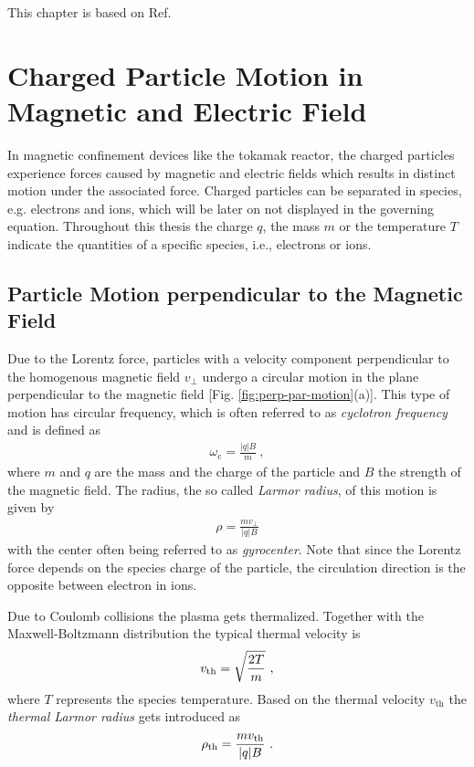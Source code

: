 
This chapter is based on Ref.  

\section{Charged Particle Motion in Magnetic and Electric Field}
\label{sec:motion}

In magnetic confinement devices like the tokamak reactor, the charged particles experience forces caused by magnetic and electric fields which results in distinct motion under the associated force. Charged particles can be separated in species, e.g. electrons and ions, which will be later on not displayed in the governing equation. Throughout this thesis the charge $q$, the mass $m$ or the temperature $T$ indicate the quantities of a specific species, i.e., electrons or ions.

\subsection{Particle Motion perpendicular to the Magnetic Field}
\label{sub:gyromotion}

Due to the Lorentz force, particles with a velocity component perpendicular to the homogenous magnetic field $v_{\perp}$ undergo a circular motion in the plane perpendicular to the magnetic field [Fig. \ref{fig:perp-par-motion}(a)]. This type of motion has circular frequency, which is often referred to as \textit{cyclotron frequency} and is defined as
\begin{gather}
    \omega_\mathrm{c} = \frac{|q|B}{m}~,
    \label{eq:cyclotron}
\end{gather}
where $m$ and $q$ are the mass and the charge of the particle and $B$ the strength of the magnetic field. The radius, the so called \textit{Larmor radius}, of this motion is given by
\begin{gather}
    \rho = \frac{mv_{\perp}}{|q|B}
    \label{eq:Larmorradius}
\end{gather}
with the center often being referred to as \textit{gyrocenter}. Note that since the Lorentz force depends on the species charge of the particle, the circulation direction is the opposite between electron in ions.\\\bigskip

Due to Coulomb collisions the plasma gets thermalized. Together with the Maxwell-Boltzmann distribution the typical thermal velocity is
\begin{gather}
    v_\mathrm{th} = \sqrt{\frac{2T}{m}}~,
    \label{eq:thermalVelocity}
\end{gather}
where $T$ represents the species temperature. Based on the thermal velocity $v_\mathrm{th}$ the \textit{thermal Larmor radius} gets introduced as
\begin{gather}
    \rho_{\mathrm{th}} = \frac{mv_\mathrm{th}}{|q|B}~.
    \label{eq:thermalLarmorradius}
\end{gather}

